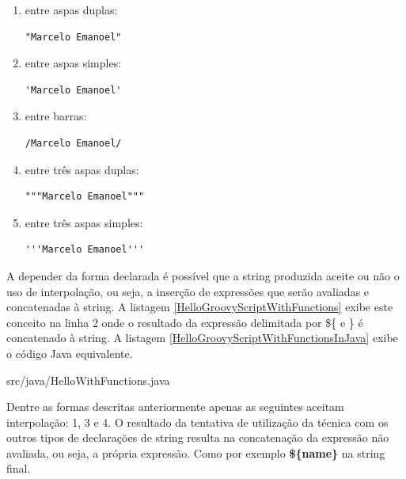 \documentclass[12pt]{article}
\begin{document}
    \begin{enumerate}
        \item entre aspas duplas: 
            \begin{lstlisting}[style=InlineGroovy]
                "Marcelo Emanoel"
            \end{lstlisting}
        \item entre aspas simples:
            \begin{lstlisting}[style=InlineGroovy]
                'Marcelo Emanoel'
            \end{lstlisting}
        \item entre barras:
            \begin{lstlisting}[style=InlineGroovy]
                /Marcelo Emanoel/
            \end{lstlisting}
        \item entre três aspas duplas: 
            \begin{lstlisting}[style=InlineGroovy]
                """Marcelo Emanoel"""
            \end{lstlisting}
        \item entre três aspas simples:
            \begin{lstlisting}[style=InlineGroovy]
                '''Marcelo Emanoel'''
            \end{lstlisting}

    \end{enumerate}
    
    A depender da forma declarada é possível que a string produzida aceite ou não
    o uso de interpolação, ou seja, a inserção de expressões que serão avaliadas
    e concatenadas à string. A listagem \ref{HelloGroovyScriptWithFunctions} exibe
    este conceito na linha 2 onde o resultado da expressão deli\-mitada por \$\{ e \}
    é concatenado à string. A listagem \ref{HelloGroovyScriptWithFunctionsInJava}
    exibe o código Java equivalente.
    
    
                    {src/java/HelloWithFunctions.java}

    Dentre as formas descritas anteriormente apenas as seguintes aceitam 
    interpolação: 1, 3 e 4. O resultado da tentativa de utilização da técnica com
    os outros tipos de declarações de string resulta na concatenação da expressão
    não avaliada, ou seja, a própria expressão. Como por exemplo \textbf{\$\{name\}}
    na string final. 
\end{document}
